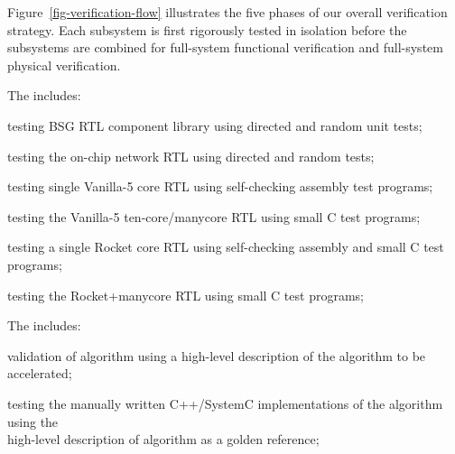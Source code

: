 

Figure~\ref{fig-verification-flow} illustrates the five phases
of our overall verification strategy. Each subsystem is first rigorously
tested in isolation before the subsystems are combined for full-system
functional verification and full-system physical verification.

\medskip
\begin{cbxlist}{1.5em}{1em}{1em}

 \item The 
    includes:

    \smallskip
    \begin{cbxlist}[--]{1.5em}{0em}{0em}
      \raggedright

      \item testing BSG RTL component library using directed and random
         unit tests;
      \item testing the on-chip network RTL using directed and random
         tests;

      \item testing single Vanilla-5 core RTL using self-checking
         assembly test programs;

      \item testing the Vanilla-5 ten-core/manycore RTL using small C
         test programs;

      \item testing a single Rocket core RTL using self-checking
         assembly and small C test programs;

      \item testing the Rocket+manycore RTL using small C test programs;

    \end{cbxlist}

 \item The  includes:

    \smallskip
    \begin{cbxlist}[--]{1.5em}{0em}{0em}
      \raggedright

      \item validation of algorithm using a high-level description of the
         algorithm to be accelerated;

      \item testing the manually written C++/SystemC implementations of
         the algorithm using the \\\hspace{0.5em}high-level description
         of algorithm as a golden reference;


\end{cbxlist}
\end{cbxlist}
